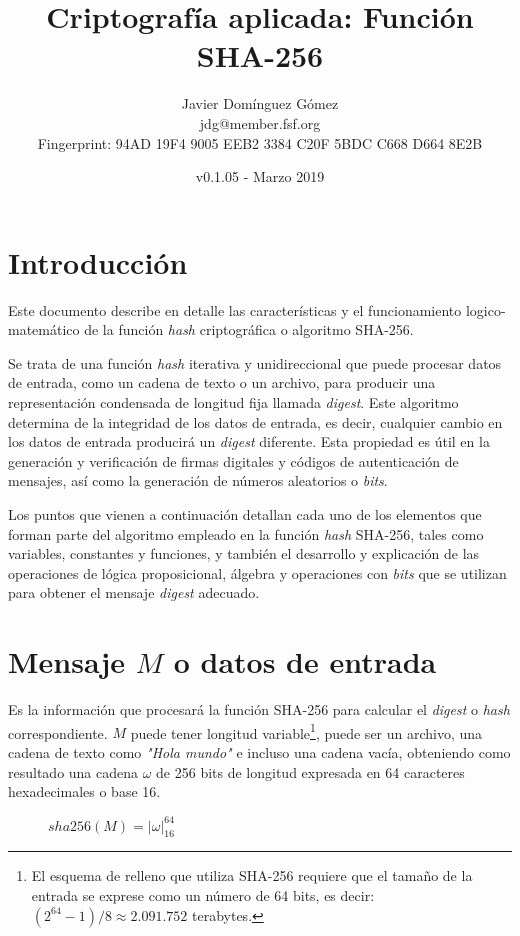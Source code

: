 \documentclass{article}
\title{\textbf{Criptografía aplicada: Función SHA-256}}
\author{Javier Domínguez Gómez \\
\small{jdg@member.fsf.org} \\
\small{Fingerprint: 94AD 19F4 9005 EEB2 3384 C20F 5BDC C668 D664 8E2B}}
\date{v0.1.05 - Marzo 2019}
\begin{document}
\maketitle

\tableofcontents{}

\section{Introducción}
    Este documento describe en detalle las características y el funcionamiento logico-matemático de la función \textit{hash} criptográfica o algoritmo SHA-256.
    
    \vspace{3mm}
    Se trata de una función \textit{hash} iterativa y unidireccional que puede procesar datos de entrada, como un cadena de texto o un archivo, para producir una representación condensada de longitud fija llamada \textit{digest}. Este algoritmo determina de la integridad de los datos de entrada, es decir, cualquier cambio en los datos de entrada producirá un \textit{digest} diferente. Esta propiedad es útil en la generación y verificación de firmas digitales y códigos de autenticación de mensajes, así como la generación de números aleatorios o \textit{bits}.
    
    \vspace{3mm}
    Los puntos que vienen a continuación detallan cada uno de los elementos que forman parte del algoritmo empleado en la función \textit{hash} SHA-256, tales como variables, constantes y funciones, y también el desarrollo y explicación de las operaciones de lógica proposicional, álgebra y operaciones con \textit{bits} que se utilizan para obtener el mensaje \textit{digest} adecuado.

\section{Mensaje $M$ o datos de entrada}
    Es la información que procesará la función SHA-256 para calcular el \textit{digest} o \textit{hash} correspondiente. $M$ puede tener longitud variable\footnote{El esquema de relleno que utiliza SHA-256 requiere que el tamaño de la entrada se exprese como un número de 64 bits, es decir: $(2^{64}-1)/8 \approx 2.091.752$ terabytes.}, puede ser un archivo, una cadena de texto como \textit{"Hola mundo"} e incluso una cadena vacía, obteniendo como resultado una cadena $\omega$ de 256 bits de longitud expresada en 64 caracteres hexadecimales o base 16.
        \begin{figure}[H]
        \centering
            $sha256(M) = |\omega|^{64}_{16}$
        \end{figure}
        
\end{document}
